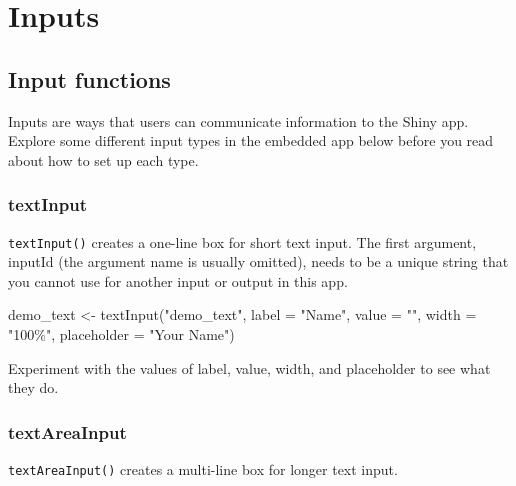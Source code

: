 \documentclass[
  oneside]{book}
\newenvironment{Shaded}{\begin{snugshade}}{\end{snugshade}}
\newcommand{\AttributeTok}[1]{\textcolor[rgb]{0.77,0.63,0.00}{#1}}
\newcommand{\FunctionTok}[1]{\textcolor[rgb]{0.00,0.00,0.00}{#1}}
\newcommand{\NormalTok}[1]{#1}
\newcommand{\OtherTok}[1]{\textcolor[rgb]{0.56,0.35,0.01}{#1}}
\newcommand{\StringTok}[1]{\textcolor[rgb]{0.31,0.60,0.02}{#1}}
\begin{document}
\hypertarget{inputs}{%
\chapter{Inputs}\label{inputs}}

\hypertarget{input-functions}{%
\section{Input functions}\label{input-functions}}

Inputs are ways that users can communicate information to the Shiny app. Explore some different input types in the embedded app below before you read about how to set up each type.

\hypertarget{textinput}{%
\subsection{textInput}\label{textinput}}

\texttt{textInput}\texttt{()} creates a one-line box for short text input. The first argument, \AttributeTok{inputId} (the argument name is usually omitted), needs to be a unique string that you cannot use for another input or output in this app.

\begin{Shaded}
\begin{Highlighting}[]
\NormalTok{demo\_text }\OtherTok{\textless{}{-}} \FunctionTok{textInput}\NormalTok{(}\StringTok{"demo\_text"}\NormalTok{, }\AttributeTok{label =} \StringTok{"Name"}\NormalTok{, }\AttributeTok{value =} \StringTok{""}\NormalTok{, }\AttributeTok{width =} \StringTok{"100\%"}\NormalTok{, }\AttributeTok{placeholder =} \StringTok{"Your Name"}\NormalTok{)}
\end{Highlighting}
\end{Shaded}

\begin{try}
Experiment with the values of \AttributeTok{label}, \AttributeTok{value}, \AttributeTok{width}, and \AttributeTok{placeholder} to see what they do.

\end{try}

\hypertarget{textareainput}{%
\subsection{textAreaInput}\label{textareainput}}

\texttt{textAreaInput}\texttt{()} creates a multi-line box for longer text input.
\end{document}
